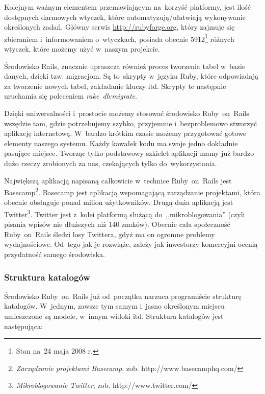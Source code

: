 \documentclass[a4paper,12pt,oneside]{report}
\begin{document}
Kolejnym ważnym elementem przemawiającym na~korzyść platformy, jest ilość dostępnych darmowych wtyczek, które automatyzują/ułatwiają wykonywanie określonych zadań. Główny serwis \url{http://rubyforge.org}, który zajmuje się zbieraniem i~informowaniem o~wtyczkach, posiada obecnie 5912\footnote{Stan na~24 maja 2008 r.} różnych wtyczek, które możemy użyć w~naszym projekcie.

Środowisko Rails, znacznie upraszcza również proces tworzenia tabel w~bazie danych, dzięki tzw. migracjom. Są to~skrypty w~języku Ruby, które odpowiadają za tworzenie nowych tabel, zakładanie kluczy itd. Skrypty te następnie uruchamia się poleceniem \emph{rake~db:migrate}.

Dzięki uniwersalności i~prostocie możemy stosować środowisko Ruby~on~Rails wszędzie tam, gdzie potrzebujemy szybko, przyjemnie i~bezproblemowo stworzyć aplikację internetową. W~bardzo krótkim czasie możemy przygotować gotowe elementy naszego systemu. Każdy kawałek kodu ma swoje jedno dokładnie pasujące miejsce. Tworząc tylko podstawowy szkielet aplikacji mamy już bardzo dużo rzeczy zrobionych za nas, czekających tylko do~wykorzystania.

Największą aplikacją napisaną całkowicie w~technice Ruby~on~Rails jest Basecamp\footnote{\emph{Zarządzanie projektami Basecamp}, zob. http://www.basecamphq.com/}. Basecamp jest aplikacją wspomagającą zarządzanie projektami, która obecnie obsługuje ponad milion użytkowników. Drugą duża aplikacją jest Twitter\footnote{\emph{Mikroblogowanie Twitter}, zob. http://www.twitter.com/}. Twitter jest z~kolei platformą służącą do~,,mikroblogowania'' (czyli pisania wpisów nie dłuższych niż 140 znaków). Obecnie cała społeczność Ruby~on~Rails śledzi losy Twittera, gdyż ma on ogromne problemy wydajnościowe. Od~tego jak je rozwiąże, zależy jak inwestorzy komercyjni ocenią przydatność samego środowiska.

\subsubsection{Struktura katalogów}
\label{subsec:rordir}
Środowisko Ruby~on~Rails już od~początku narzuca programiście strukturę katalogów. W~jednym, zawsze tym samym i~jasno określonym miejscu umieszczone są modele, w~innym widoki itd. Struktura katalogów jest następująca:
\end{document}
